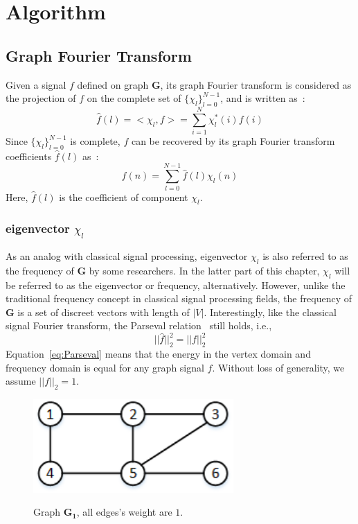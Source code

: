 \section{Algorithm}
\label{sec:algorithm}

\subsection{Graph Fourier Transform}
\label{sec:Graph_Fourier_Transform}
Given a signal $f$ defined on graph $\mathbf{G}$, its graph Fourier transform is considered as the projection of $f$ on the complete set of $\{\chi_l\}_{l=0}^{N-1}$, and is written as~\cite{hammond2011wavelets}:
\begin{equation}
\label{eq:Graph_Fourier_Transform1}
\hat{f}(l)=<\chi_{l},f>=\sum_{i=1}^{N}\chi^*_{l}(i)f(i)
\end{equation}
Since $\{\chi_l\}_{l=0}^{N-1}$ is complete, $f$ can be recovered by its graph Fourier transform coefficients $\hat{f}(l)$ as~\cite{hammond2011wavelets}:
\begin{equation}
\label{eq:Inverser_Graph_Fourier_Transform}
f(n)=\sum_{l=0}^{N-1}\hat{f}(l)\chi_{l}(n)
\end{equation}
Here, $\hat{f}(l)$ is the coefficient of component $\chi_l$.
\subsubsection{eigenvector $\chi_l$}
As an analog with classical signal processing, eigenvector $\chi_l$ is also referred to as
the  frequency of $\mathbf{G}$ by some researchers. In the latter part of this chapter, $\chi_l$ will be referred to as the eigenvector or frequency, alternatively. However, unlike the traditional frequency concept in classical signal processing fields, the frequency of $\mathbf{G}$ is a set of discreet vectors with length of $|V|$. Interestingly, like the classical signal Fourier transform, the
Parseval relation~\cite{shuman2015vertex} still holds, i.e.,
\begin{equation}
\label{eq:Parseval}
||\hat{f}||_2^2=||f||_2^2
\end{equation}
Equation~\ref{eq:Parseval} means that the
energy in the vertex domain and frequency domain is equal for any graph signal $f$. Without loss of generality, we assume $||f||_2 =1$.



\begin{figure}[h]
	\centering
    {
		\includegraphics[height=1.4in] {figures/graph_G.png}
	}
	\caption{Graph $\mathbf{G_1}$, all edges's weight are $1$.}
	\label{fig:graph_G}
\end{figure}


